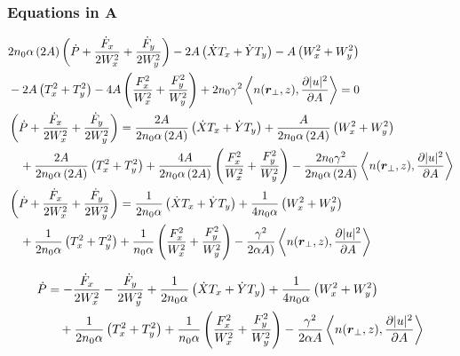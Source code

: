 \subsubsection{ Equations in A}
\begin{equation}
\begin{split}
    &2 n_0 \alpha\, (2A) \left(\dot{P}  + \frac{\dot{F}_{x} }{2W_{x}^2} + \frac{\dot{F}_{y}}{2W_{y}^2} \right) - 2A  \left(\dot{X}T_x + \dot{Y} T_y\right)  - A  \left(W_x^2+ W_y^2\right) \\
    &- 2A  \left(T_x^2 + T_y^2 \right) - 4A  \left(\frac{F_{x}^2}{W_{x}^2} + \frac{F_{y}^2}{W_{y}^2}\right) +  2n_0 \gamma^2 \left< n(\mbox{\boldmath{$r$}}_{\perp},z),\frac{\partial |u|^2}{\partial A}\right> = 0\\
    & \left(\dot{P}  + \frac{\dot{F}_{x} }{2W_{x}^2} + \frac{\dot{F}_{y}}{2W_{y}^2} \right) = \frac{2A}{2 n_0 \alpha\, (2A)}  \left(\dot{X}T_x + \dot{Y} T_y\right)  + \frac{A}{2 n_0 \alpha\, (2A)}  \left(W_x^2+ W_y^2\right) \\
    &\quad+ \frac{2A}{2 n_0 \alpha\, (2A)}  \left(T_x^2 + T_y^2 \right) + \frac{4A}{2 n_0 \alpha\, (2A)}  \left(\frac{F_{x}^2}{W_{x}^2} + \frac{F_{y}^2}{W_{y}^2}\right) -  \frac{2n_0 \gamma^2}{2 n_0 \alpha\, (2A)} \left< n(\mbox{\boldmath{$r$}}_{\perp},z),\frac{\partial |u|^2}{\partial A}\right> \\ 
    & \left(\dot{P}  + \frac{\dot{F}_{x} }{2W_{x}^2} + \frac{\dot{F}_{y}}{2W_{y}^2} \right) = \frac{1}{2 n_0 \alpha}  \left(\dot{X}T_x + \dot{Y} T_y\right)  + \frac{1}{4 n_0 \alpha}  \left(W_x^2+ W_y^2\right) \\
    &\quad + \frac{1}{2 n_0 \alpha}  \left(T_x^2 + T_y^2 \right) + \frac{1}{n_0 \alpha}  \left(\frac{F_{x}^2}{W_{x}^2} + \frac{F_{y}^2}{W_{y}^2}\right) -  \frac{\gamma^2}{2 \alpha A)} \left< n(\mbox{\boldmath{$r$}}_{\perp},z),\frac{\partial |u|^2}{\partial A}\right>    
\end{split}
\end{equation}

\begin{equation}
\begin{split}
    \dot{P}  &= -\frac{\dot{F}_{x} }{2W_{x}^2} - \frac{\dot{F}_{y}}{2W_{y}^2} 
    + \frac{1}{2 n_0 \alpha}  \left(\dot{X}T_x + \dot{Y} T_y\right) 
     + \frac{1}{4 n_0 \alpha}  \left(W_x^2+ W_y^2\right) \\    
    &\quad + \frac{1}{2 n_0 \alpha}  \left(T_x^2 + T_y^2 \right) + \frac{1}{n_0 \alpha}  \left(\frac{F_{x}^2}{W_{x}^2} + \frac{F_{y}^2}{W_{y}^2}\right) -  \frac{\gamma^2}{2 \alpha A} \left< n(\mbox{\boldmath{$r$}}_{\perp},z),\frac{\partial |u|^2}{\partial A}\right>    
\end{split}
\end{equation}



